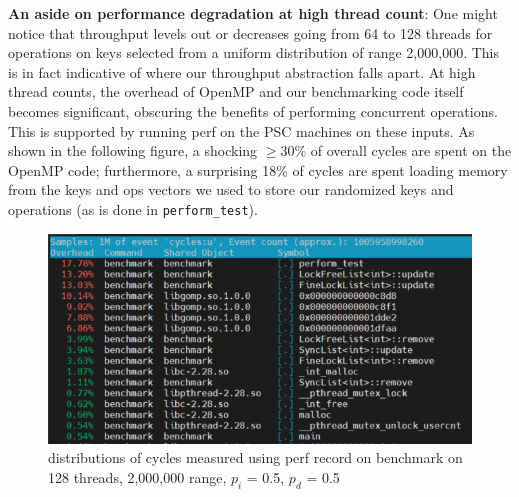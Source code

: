 \documentclass[11pt]{article}
\newcommand{\ttt}[1]{\texttt{#1}}
\begin{document}
\textbf{An aside on performance degradation at high thread count}: One might notice that throughput levels out or decreases going from 64 to 128 threads for operations on keys selected from a uniform distribution of range 2,000,000. This is in fact indicative of where our throughput abstraction falls apart. At high thread counts, the overhead of OpenMP and our benchmarking code itself becomes significant, obscuring the benefits of performing concurrent operations. This is supported by running perf on the PSC machines on these inputs. As shown in the following figure, a shocking $\geq$30\% of overall cycles are spent on the OpenMP code; furthermore, a surprising 18\% of cycles are spent loading memory from the keys and ops vectors we used to store our randomized keys and operations (as is done in \ttt{perform\_test}).
\begin{figure}[h!]
  \includegraphics[width=5in]{psc_benchmark_cycles.png}
  \caption{distributions of cycles measured using perf record on benchmark on 128 threads, 2,000,000 range, $p_i$ = 0.5, $p_d$ = 0.5}
\end{figure}
\end{document}
